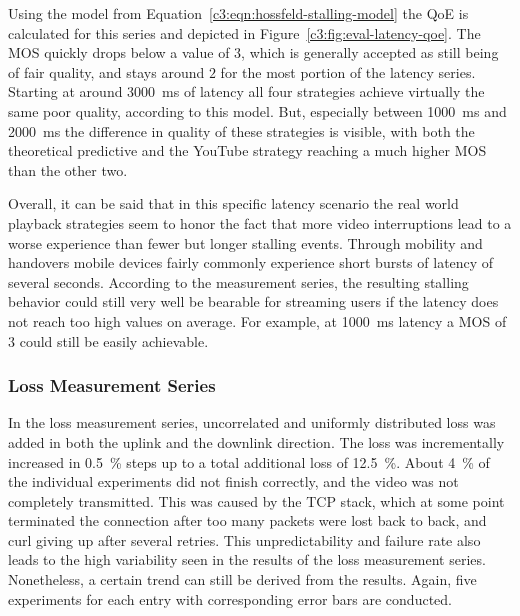 Using the model from Equation~\ref{c3:eqn:hossfeld-stalling-model} the \gls{QoE} is calculated for this series and depicted in Figure~\ref{c3:fig:eval-latency-qoe}. The \gls{MOS} quickly drops below a value of $3$, which is generally accepted as still being of fair quality, and stays around $2$ for the most portion of the latency series. Starting at around \SI{3000}{\milli\second} of latency all four strategies achieve virtually the same poor quality, according to this model. But, especially between \SI{1000}{\milli\second} and \SI{2000}{\milli\second} the difference in quality of these strategies is visible, with both the theoretical predictive and the YouTube strategy reaching a much higher \gls{MOS} than the other two.

Overall, it can be said that in this specific latency scenario the real world playback strategies seem to honor the fact that more video interruptions lead to a worse experience than fewer but longer stalling events. Through mobility and handovers mobile devices fairly commonly experience short bursts of latency of several seconds. According to the measurement series, the resulting stalling behavior could still very well be bearable for streaming users if the latency does not reach too high values on average. For example, at \SI{1000}{\milli\second} latency a \gls{MOS} of $3$ could still be easily achievable.


\subsubsection{Loss Measurement Series}

In the loss measurement series, uncorrelated and uniformly distributed loss was added in both the uplink and the downlink direction. The loss was incrementally increased in \SI{0.5}{\percent} steps up to a total additional loss of \SI{12.5}{\percent}. About \SI{4}{\percent} of the individual experiments did not finish correctly, and the video was not completely transmitted. This was caused by the \gls{TCP} stack, which at some point terminated the connection after too many packets were lost back to back, and curl giving up after several retries. This unpredictability and failure rate also leads to the high variability seen in the results of the loss measurement series. Nonetheless, a certain trend can still be derived from the results. Again, five experiments for each entry with corresponding error bars are conducted.


